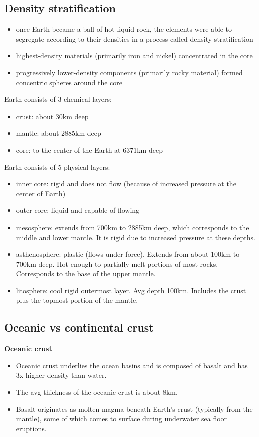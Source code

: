 \subsection{Density stratification}

\begin{itemize}
	\item once Earth became a ball of hot liquid rock, the elements were
		able to segregate according to their densities in a process
		called density stratification
	\item highest-density materials (primarily iron and nickel)
		concentrated in the core
	\item progressively lower-density components (primarily rocky material)
		formed concentric spheres around the core
\end{itemize}

Earth consists of 3 chemical layers:
\begin{itemize}
	\item crust: about 30km deep
	\item mantle: about 2885km deep
	\item core: to the center of the Earth at 6371km deep
\end{itemize}

Earth consists of 5 physical layers:
\begin{itemize}
	\item inner core: rigid and does not flow (because of increased
		pressure at the center of Earth)
	\item outer core: liquid and capable of flowing
	\item mesosphere: extends from 700km to 2885km deep, which
		corresponds to the middle and lower mantle.
		It is rigid due to increased pressure at these depths.
	\item asthenosphere: plastic (flows under force). Extends from about
		100km to 700km deep. Hot enough to partially melt portions
		of most rocks. Corresponds to the base of the upper mantle.
	\item litosphere: cool rigid outermost layer. Avg depth 100km.
		Includes the crust plus the topmost portion of the mantle.
\end{itemize}

\subsection{Oceanic vs continental crust}

\textbf{Oceanic crust}
\begin{itemize}
	\item Oceanic crust underlies the ocean basins and is composed of
		basalt and has 3x higher density than water.
	\item The avg thickness of the oceanic crust is about 8km.
	\item Basalt originates as molten magma beneath Earth's crust
		(typically from the mantle), some of which comes to surface
		during underwater sea floor eruptions.
\end{itemize}

